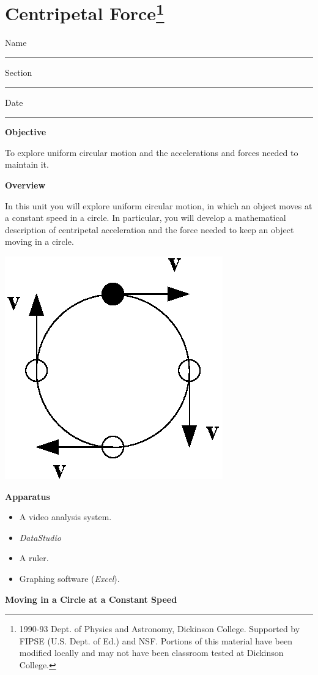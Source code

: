 \section{Centripetal Force\footnote{
1990-93 Dept. of Physics and Astronomy, Dickinson College. Supported by FIPSE
(U.S. Dept. of Ed.) and NSF. Portions of this material have been modified locally
and may not have been classroom tested at Dickinson College.
}}

Name \rule{2.0in}{0.1pt}\hfill{}Section \rule{1.0in}{0.1pt}\hfill{}Date \rule{1.0in}{0.1pt}

\textbf{Objective} 

To explore uniform circular motion and the accelerations and
forces needed to maintain it.

\textbf{Overview} 

In this unit you will explore uniform circular motion, in which an object moves at a constant
speed in a circle. In particular, you will develop a mathematical description
of centripetal acceleration and the force needed to keep an object moving in
a circle.

\vspace{0.3cm}
{\par\centering \includegraphics{centripetalForceFor132/centripetal_fig1b.eps} \par}
\vspace{0.3cm}

\textbf{Apparatus}

\begin{itemize}
\item A video analysis system. 
\item {\it DataStudio}
\item A ruler. 
\item Graphing software ({\it Excel}). 
\end{itemize}
\textbf{Moving in a Circle at a Constant Speed }

